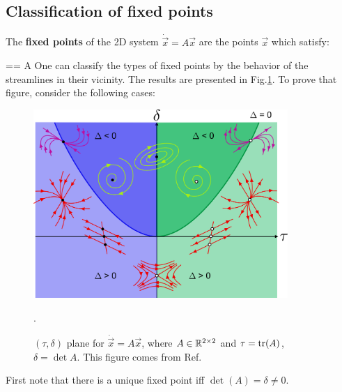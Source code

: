 \subsection{Classification of fixed points}

The {\bf fixed points} of the 2D system $\dot{\vec{x}}=A\vec{x}$ are 
the points $\vec{x}$ which satisfy:

== A
\eeq
One can classify the types of fixed points by the behavior
of the streamlines in their vicinity.
The results are 
presented in Fig.\ref{fig-wiki-pp}.
To prove that figure, consider the following cases:


\begin{figure}[h!]
\centering
\includegraphics[width=3.8in]
{dynamical-sys/Phase_plane_nodes.png}
\caption{
$(\tau, \delta)$ plane
for $\dot{\vec{x}} = A \vec{x}$, where $A\in  { \mathbb{R}}^{2\times 2}$ and  $\tau={\rm tr }(A)$, $\delta=\det{A}$. This
figure  comes from Ref.\cite{wiki-phase-plane}}.
\label{fig-wiki-pp}
\end{figure}

First note that there is a unique fixed point iff 
$\det(A)=\delta\neq 0$.

